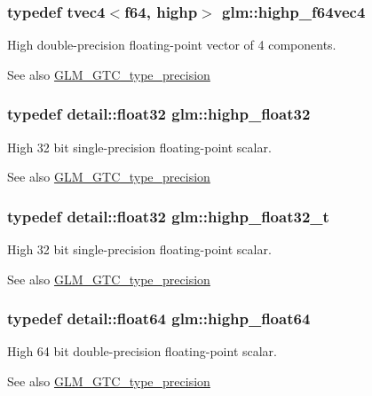 \subsubsection[{highp\+\_\+f64vec4}]{\setlength{\rightskip}{0pt plus 5cm}typedef tvec4$<${\bf f64}, highp$>$ {\bf glm\+::highp\+\_\+f64vec4}}\label{namespaceglm_a9cd05269ce35a146935adeba5e63d189}
High double-\/precision floating-\/point vector of 4 components. \begin{DoxySeeAlso}{See also}
\hyperlink{group__gtc__type__precision}{G\+L\+M\+\_\+\+G\+T\+C\+\_\+type\+\_\+precision} 
\end{DoxySeeAlso}
\hypertarget{namespaceglm_a91af7513c1102410646f2c435ca29be5}{}
\subsubsection[{highp\+\_\+float32}]{\setlength{\rightskip}{0pt plus 5cm}typedef detail\+::float32 {\bf glm\+::highp\+\_\+float32}}\label{namespaceglm_a91af7513c1102410646f2c435ca29be5}
High 32 bit single-\/precision floating-\/point scalar. \begin{DoxySeeAlso}{See also}
\hyperlink{group__gtc__type__precision}{G\+L\+M\+\_\+\+G\+T\+C\+\_\+type\+\_\+precision} 
\end{DoxySeeAlso}
\hypertarget{namespaceglm_a4e16a7818d09e2da3b81765999f23928}{}
\subsubsection[{highp\+\_\+float32\+\_\+t}]{\setlength{\rightskip}{0pt plus 5cm}typedef detail\+::float32 {\bf glm\+::highp\+\_\+float32\+\_\+t}}\label{namespaceglm_a4e16a7818d09e2da3b81765999f23928}
High 32 bit single-\/precision floating-\/point scalar. \begin{DoxySeeAlso}{See also}
\hyperlink{group__gtc__type__precision}{G\+L\+M\+\_\+\+G\+T\+C\+\_\+type\+\_\+precision} 
\end{DoxySeeAlso}
\hypertarget{namespaceglm_ab871a78c548d2fa53e1e8ec64a46eee7}{}
\subsubsection[{highp\+\_\+float64}]{\setlength{\rightskip}{0pt plus 5cm}typedef detail\+::float64 {\bf glm\+::highp\+\_\+float64}}\label{namespaceglm_ab871a78c548d2fa53e1e8ec64a46eee7}
High 64 bit double-\/precision floating-\/point scalar. \begin{DoxySeeAlso}{See also}
\hyperlink{group__gtc__type__precision}{G\+L\+M\+\_\+\+G\+T\+C\+\_\+type\+\_\+precision} 
\end{DoxySeeAlso}
\hypertarget{namespaceglm_ae8b3b2ace5be2a61c6bf63f12643fa15}{}
